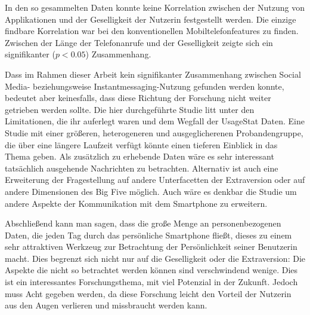 \par
In den so gesammelten Daten konnte keine Korrelation zwischen der Nutzung von Applikationen und der Geselligkeit der Nutzerin festgestellt werden. 
Die einzige findbare Korrelation war bei den konventionellen Mobiltelefonfeatures zu finden.
Zwischen der Länge der Telefonanrufe und der Geselligkeit zeigte sich ein signifikanter ($p < 0.05$) Zusammenhang.
\par
Dass im Rahmen dieser Arbeit kein signifikanter Zusammenhang zwischen Social Media- beziehungsweise Instantmessaging-Nutzung gefunden werden konnte, bedeutet aber keinesfalls,
dass diese Richtung der Forschung nicht weiter getrieben werden sollte.
Die hier durchgeführte Studie litt unter den Limitationen, die ihr auferlegt waren und dem Wegfall der UsageStat Daten.
Eine Studie mit einer größeren, heterogeneren und ausgeglicherenen Probandengruppe, die über eine längere Laufzeit verfügt könnte einen tieferen Einblick in das Thema geben.
Als zusätzlich zu erhebende Daten wäre es sehr interessant tatsächlich ausgehende Nachrichten zu betrachten.
Alternativ ist auch eine Erweiterung der Fragestellung auf andere Unterfacetten der Extraversion oder auf andere Dimensionen des Big Five möglich.
Auch wäre es denkbar die Studie um andere Aspekte der Kommunikation mit dem Smartphone zu erweitern.
\par
Abschließend kann man sagen, dass die große Menge an personenbezogenen Daten,
die jeden Tag durch das persönliche Smartphone fließt, dieses zu einem sehr attraktiven Werkzeug zur Betrachtung der Persönlichkeit seiner Benutzerin macht.
Dies begrenzt sich nicht nur auf die Geselligkeit oder die Extraversion: Die Aspekte die nicht so betrachtet werden können sind verschwindend wenige.
Dies ist ein interessantes Forschungsthema, mit viel Potenzial in der Zukunft.
Jedoch muss Acht gegeben werden, da
diese Forschung leicht den Vorteil der Nutzerin aus den Augen verlieren und missbraucht werden kann. 


